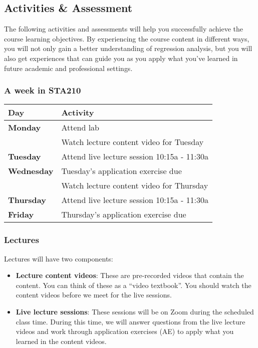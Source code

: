 \documentclass[
]{article}
\begin{document}
\hypertarget{activities-assessment}{%
\subsection{Activities \& Assessment}\label{activities-assessment}}

The following activities and assessments will help you successfully
achieve the course learning objectives. By experiencing the course
content in different ways, you will not only gain a better understanding
of regression analysis, but you will also get experiences that can guide
you as you apply what you've learned in future academic and professional
settings.

\hypertarget{a-week-in-sta210}{%
\subsubsection{A week in STA210}\label{a-week-in-sta210}}

\begin{longtable}[]{@{}ll@{}}
\toprule
\textbf{Day} & \textbf{Activity}\tabularnewline
\midrule
\endhead
\textbf{Monday} & Attend lab\tabularnewline
& Watch lecture content video for Tuesday\tabularnewline
\textbf{Tuesday} & Attend live lecture session 10:15a -
11:30a\tabularnewline
\textbf{Wednesday} & Tuesday's application exercise due\tabularnewline
& Watch lecture content video for Thursday\tabularnewline
\textbf{Thursday} & Attend live lecture session 10:15a -
11:30a\tabularnewline
\textbf{Friday} & Thursday's application exercise due\tabularnewline
\bottomrule
\end{longtable}

\hypertarget{lectures}{%
\subsubsection{Lectures}\label{lectures}}

Lectures will have two components:

\begin{itemize}
\item
  \textbf{Lecture content videos}: These are pre-recorded videos that
  contain the content. You can think of these as a ``video textbook''.
  You should watch the content videos before we meet for the live
  sessions.
\item
  \textbf{Live lecture sessions}: These sessions will be on Zoom during
  the scheduled class time. During this time, we will answer questions
  from the live lecture videos and work through application exercises
  (AE) to apply what you learned in the content videos.
\end{itemize}
\end{document}
